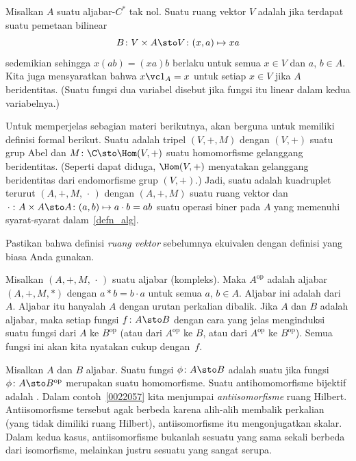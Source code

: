 \begin{defn}\label{0038017} Misalkan $A$ suatu aljabar-$C^*$ tak nol. Suatu ruang vektor $V$ adalah
jika terdapat suatu pemetaan bilinear
  \[ B\colon V \times A \sto V\colon (x,a) \mapsto xa \]
sedemikian sehingga $x(ab) = (xa)b$ berlaku untuk semua $x \in V$ dan $a$, $b \in A$. Kita juga mensyaratkan
bahwa $x \vc 1_A = x$ untuk setiap $x \in V$ jika $A$ beridentitas. (Suatu fungsi dua variabel
disebut  jika fungsi itu linear dalam kedua variabelnya.)
\end{defn}

\begin{defn}\label{0038021} Untuk memperjelas sebagian materi berikutnya, akan
berguna untuk memiliki definisi formal berikut. Suatu
 adalah tripel $(V,+,M)$ dengan $(V,+)$ suatu grup Abel dan
$M\colon \C \sto \Hom(V,+)$ suatu homomorfisme gelanggang beridentitas. (Seperti dapat diduga,
$\Hom(V,+)$ menyatakan gelanggang beridentitas dari endomorfisme grup $(V,+)$.) Jadi, suatu
 adalah kuadruplet terurut $(A,+,M,\,\cdot\,)$ dengan $(A,+,M)$ suatu ruang
vektor dan $\,\cdot\,\colon A \times A \sto A \colon (a,b) \mapsto a \cdot b = ab$ suatu
operasi biner pada $A$ yang memenuhi syarat-syarat dalam~\ref{defn_alg}.
\end{defn}

\begin{exer} Pastikan bahwa definisi \emph{ruang vektor} sebelumnya ekuivalen
dengan definisi yang biasa Anda gunakan.
\end{exer}

\begin{defn} Misalkan $(A,+,M,\,\cdot\,)$ suatu aljabar (kompleks). Maka $A^{\textrm{op}}$
adalah aljabar $(A,+,M,*)$ dengan $a*b = b\cdot a$ untuk semua $a$, $b \in A$. Aljabar ini adalah
 dari~$A$. Aljabar itu hanyalah $A$ dengan urutan perkalian dibalik.
Jika $A$ dan $B$ adalah aljabar, maka setiap fungsi $f \colon A \sto B$ dengan cara yang jelas menginduksi
suatu fungsi dari $A$ ke $B^{\textrm{op}}$ (atau dari $A^{\textrm{op}}$ ke $B$,
atau dari $A^{\textrm{op}}$ ke $B^{\textrm{op}}$). Semua fungsi ini akan kita nyatakan
cukup dengan~$f$.
\end{defn}

\begin{defn}\label{0038027} Misalkan $A$ dan $B$ aljabar. Suatu fungsi
$\phi\colon A \sto B$ adalah suatu
 jika fungsi $\phi\colon A \sto B^{\textrm{op}}$ merupakan suatu homomorfisme.
Suatu antihomomorfisme bijektif adalah
. Dalam contoh~\ref{0022057} kita menjumpai \emph{antiisomorfisme}
ruang Hilbert. Antiisomorfisme tersebut agak berbeda karena alih-alih membalik perkalian
(yang tidak dimiliki ruang Hilbert), antiisomorfisme itu mengonjugatkan skalar. Dalam kedua kasus,
antiisomorfisme bukanlah sesuatu yang sama sekali berbeda dari isomorfisme, melainkan justru
sesuatu yang sangat serupa.
\end{defn}

